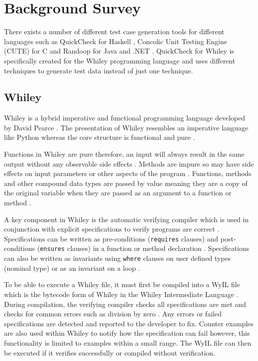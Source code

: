 \section{Background Survey}\label{section:background}


There exists a number of different test case generation tools for different languages such as QuickCheck for Haskell \cite{QClightweight}, Concolic Unit Testing Engine (CUTE) for C \cite{CUTE} and Randoop for Java \cite{randoopJava} and .NET \cite{randoopAll}.
QuickCheck for Whiley is specifically created for the Whiley programming language and uses different techniques to generate test data instead of just one technique.

\subsection{Whiley}
Whiley is a hybrid imperative and functional programming language developed by David Pearce \cite{WhileyPlatform}. The presentation of Whiley resembles an imperative language like Python whereas the core structure is functional and pure \cite{WhileyPlatform}. 

Functions in Whiley are pure therefore, an input will always result in the same output without any observable side effects \cite{WhileyLang}.
Methods are impure so may have side effects on input parameters or other aspects of the program \cite{WhileyLang}. 
Functions, methods and other compound data types are passed by value meaning they are a copy of the original variable when they are passed as an argument to a function or method \cite{WhileyPlatform}.


A key component in Whiley is the automatic verifying compiler
which is used in conjunction with explicit specifications to verify programs are correct \cite{WhileyPlatform}.
Specifications can be written as pre-conditions (\texttt{requires} clauses) and post-conditions (\texttt{ensures} clauses) in a function or method declaration \cite{WhileyPlatform}.
Specifications can also be written as invariants using \texttt{where} clauses on user defined types (nominal type) or as an invariant on a loop \cite{WhileyPlatform}. 

To be able to execute a Whiley file, it must first be compiled into a WyIL file which is the bytecode form of Whiley in the Whiley Intermediate Language \cite{WhileyPlatform}.
During compilation, the verifying compiler checks all specifications are met and checks for common errors such as division by zero \cite{WhileyPlatform}. Any errors or failed specifications are detected and reported to the developer to fix. Counter examples are also used within Whiley to notify how the specification can fail however, this functionality is limited to examples within a small range.
The WyIL file can then be executed if it verifies successfully or compiled without verification.

